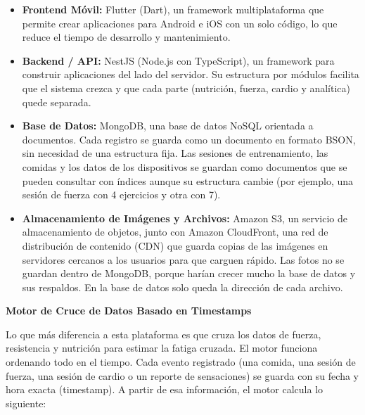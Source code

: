 \begin{itemize}
    \item \textbf{Frontend Móvil:} Flutter (Dart), un framework multiplataforma que permite crear aplicaciones para Android e iOS con un solo código, lo que reduce el tiempo de desarrollo y mantenimiento.
    \item \textbf{Backend / API:} NestJS (Node.js con TypeScript), un framework para construir aplicaciones del lado del servidor. Su estructura por módulos facilita que el sistema crezca y que cada parte (nutrición, fuerza, cardio y analítica) quede separada.
    \item \textbf{Base de Datos:} MongoDB, una base de datos NoSQL orientada a documentos. Cada registro se guarda como un documento en formato BSON, sin necesidad de una estructura fija. Las sesiones de entrenamiento, las comidas y los datos de los dispositivos se guardan como documentos que se pueden consultar con índices aunque su estructura cambie (por ejemplo, una sesión de fuerza con 4 ejercicios y otra con 7).
    \item \textbf{Almacenamiento de Imágenes y Archivos:} Amazon S3, un servicio de almacenamiento de objetos, junto con Amazon CloudFront, una red de distribución de contenido (CDN) que guarda copias de las imágenes en servidores cercanos a los usuarios para que carguen rápido. Las fotos no se guardan dentro de MongoDB, porque harían crecer mucho la base de datos y sus respaldos. En la base de datos solo queda la dirección de cada archivo.
\end{itemize}

\textbf{Motor de Cruce de Datos Basado en Timestamps}

Lo que más diferencia a esta plataforma es que cruza los datos de fuerza, resistencia y nutrición para estimar la fatiga cruzada. El motor funciona ordenando todo en el tiempo. Cada evento registrado (una comida, una sesión de fuerza, una sesión de cardio o un reporte de sensaciones) se guarda con su fecha y hora exacta (timestamp). A partir de esa información, el motor calcula lo siguiente:

